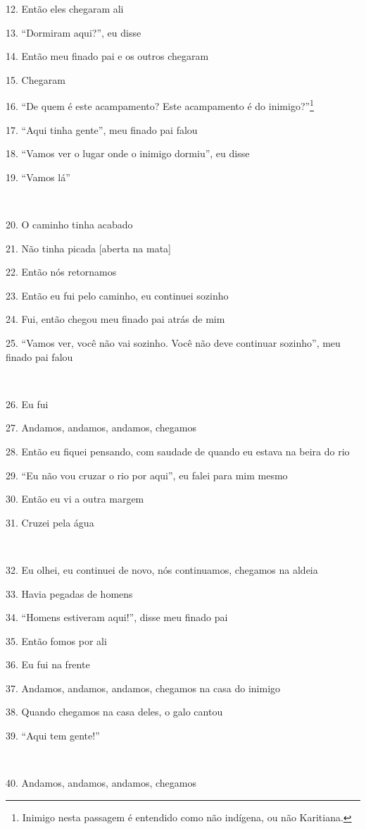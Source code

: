 12. Então eles chegaram ali

13. ``Dormiram aqui?'', eu disse

14. Então meu finado pai e os outros chegaram

15. Chegaram

16. ``De quem é este acampamento? Este acampamento é do inimigo?''\footnote{Inimigo
  nesta passagem é entendido como não indígena, ou não Karitiana.}

17. ``Aqui tinha gente'', meu finado pai falou

18. ``Vamos ver o lugar onde o inimigo dormiu'', eu disse

19. ``Vamos lá''

~

20. O caminho tinha acabado

21. Não tinha picada {[}aberta na mata{]}

22. Então nós retornamos

23. Então eu fui pelo caminho, eu continuei sozinho

24. Fui, então chegou meu finado pai atrás de mim

25. ``Vamos ver, você não vai sozinho. Você não deve continuar sozinho'',
meu finado pai falou

~

26. Eu fui

27. Andamos, andamos, andamos, chegamos

28. Então eu fiquei pensando, com saudade de quando eu estava na beira do
rio

29. ``Eu não vou cruzar o rio por aqui'', eu falei para mim mesmo

30. Então eu vi a outra margem

31. Cruzei pela água

~

32. Eu olhei, eu continuei de novo, nós continuamos, chegamos na aldeia

33. Havia pegadas de homens

34. ``Homens estiveram aqui!'', disse meu finado pai

35. Então fomos por ali

36. Eu fui na frente

37. Andamos, andamos, andamos, chegamos na casa do inimigo

38. Quando chegamos na casa deles, o galo cantou

39. ``Aqui tem gente!''

~

40. Andamos, andamos, andamos, chegamos

